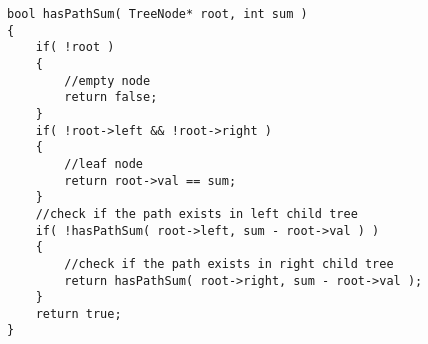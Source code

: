 \setcounter{lstlisting}{0}
\begin{lstlisting}[style=customc, caption={Recursion}]
bool hasPathSum( TreeNode* root, int sum )
{
    if( !root )
    {
        //empty node
        return false;
    }
    if( !root->left && !root->right )
    {
        //leaf node
        return root->val == sum;
    }
    //check if the path exists in left child tree
    if( !hasPathSum( root->left, sum - root->val ) )
    {
        //check if the path exists in right child tree
        return hasPathSum( root->right, sum - root->val );
    }
    return true;
}
\end{lstlisting}